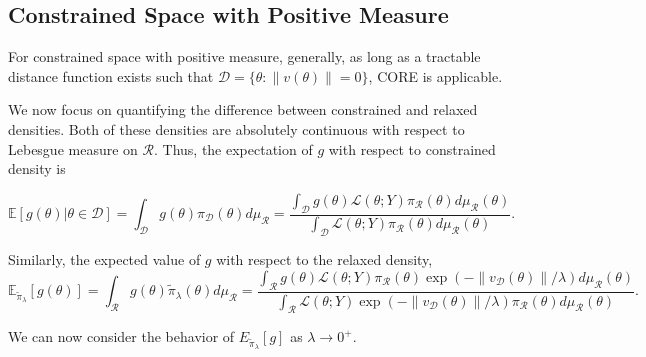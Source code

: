 \documentclass[10pt,fleqn]{article}
\newcommand{\bb}[1]{\mathbb{#1}} \newcommand{\mc}[1]{\mathcal{#1}}
\DeclareMathOperator{\1}{\mathbbm{1}} \DeclareMathOperator{\bigO}{\mc O}
\begin{document}
\subsection{Constrained
Space with Positive Measure } \label{SEC:Positive_measure_theory}

For constrained space with positive measure, generally, as long
as a tractable distance function exists such that $\mc D=\{\theta:
\|v(\theta)\|=0\}$, CORE is applicable.

We now focus on quantifying the difference between constrained and
relaxed densities.  Both of these densities are absolutely continuous
with respect to Lebesgue
measure on $\mathcal{R}$.  Thus, the expectation of $g$ with respect to
constrained density is

\begin{equation}
\label{EQ:Expectation_Positive_Measure_Constraint} \bb
E[g(\theta)|\theta\in\mathcal{D}] = \int_\mathcal{D}
g(\theta)\pi_\mathcal{D}(\theta)d\mu_\mathcal{R} =
\frac{\int_\mathcal{D} g(\theta)\mathcal{L}(\theta; Y)
\pi_\mathcal{R}(\theta)d\mu_\mathcal{R}(\theta)}{\int_\mathcal{D}
\mathcal{L}(\theta; Y)
\pi_\mathcal{R}(\theta)d\mu_\mathcal{R}(\theta)}.
\end{equation}

Similarly, the expected value of $g$ with respect to the relaxed density,
\begin{equation} \label{EQ:Expectation_Positive_Measure_Relaxed}
\bb E_{\tilde{\pi}_\lambda}[g(\theta)] = \int_\mathcal{R}
g(\theta)\tilde{\pi}_\lambda(\theta)d\mu_\mathcal{R} =
\frac{\int_\mathcal{R} g(\theta)\mathcal{L}(\theta; Y)
\pi_\mathcal{R}(\theta)
\exp(-\|v_{\mc
D}(\theta)\|/\lambda)d\mu_\mathcal{R}(\theta)}{\int_\mathcal{R}
\mathcal{L}(\theta; Y)\exp(-\| v_{\mc D}(\theta)\|/\lambda)
\pi_\mathcal{R}(\theta)d\mu_\mathcal{R}(\theta)}.\end{equation}

We can now consider the behavior of $E_{\tilde{\pi}_\lambda}[g]$ as $\lambda
\to 0^+.$
\end{document}
